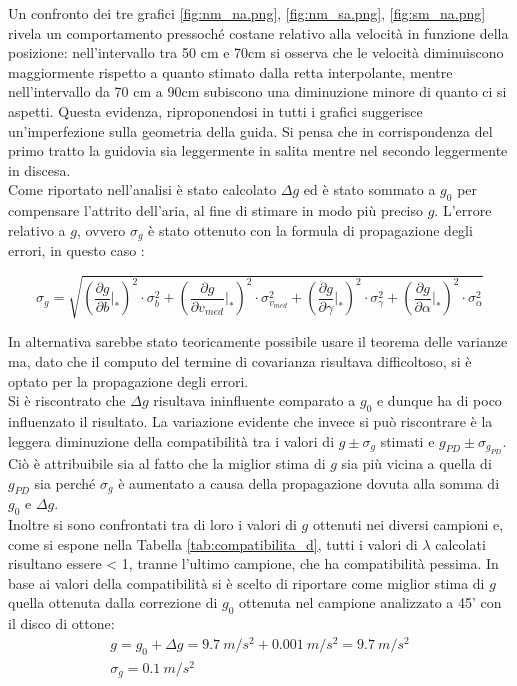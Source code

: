 \documentclass[a4paper,11pt,oneside]{article}
\begin{document}
Un confronto dei tre grafici \ref{fig:nm_na.png}, \ref{fig:nm_sa.png}, \ref{fig:sm_na.png} rivela un comportamento pressoché costane relativo alla velocità in funzione della posizione: nell'intervallo tra 50 \si{cm} e 70\si{cm} si osserva che le velocità diminuiscono maggiormente rispetto a quanto stimato dalla retta interpolante, mentre nell'intervallo da 70 \si{cm} a 90\si{cm} subiscono una diminuzione minore di quanto ci si aspetti. Questa evidenza, riproponendosi in tutti i grafici suggerisce un'imperfezione sulla geometria della guida. Si pensa che in corrispondenza del primo tratto la guidovia sia leggermente in salita mentre nel secondo leggermente in discesa.\\
Come riportato nell'analisi è stato calcolato $\Delta g$ ed è stato sommato a $g_0$ per compensare l'attrito dell'aria, al fine di stimare in modo più preciso $g$. L'errore relativo a $g$, ovvero $\sigma_{g}$ è stato ottenuto con la formula di propagazione degli errori, in questo caso :

\begin{equation*}
      \sigma_{g}= \sqrt{
   \left( {\frac{\partial g}{\partial b}} \Big|_{\ast}\right)^{2} \cdot \sigma_{b}^2  +   
   \left( {\frac{\partial g}{\partial v_{med}}}\Big|_{\ast}\right )^{2} \cdot \sigma_{v_{med}}^2   +   
   \left( {\frac{\partial g}{\partial \gamma}}\Big|_{\ast}\right)^{2}  \cdot \sigma_{\gamma}^2 +   
    \left( {\frac{\partial g}{\partial \alpha}}\Big|_{\ast}\right)^{2} \cdot  \sigma_{\alpha}^2}
\end{equation*}

In alternativa sarebbe stato teoricamente possibile usare il teorema delle varianze ma, dato che il computo del termine di covarianza risultava difficoltoso, si è optato per la propagazione degli errori.\\

Si è riscontrato che $\Delta g$ risultava ininfluente comparato a $g_0$ e dunque ha di poco influenzato il risultato. La variazione evidente che invece si può riscontrare è la leggera diminuzione della compatibilità tra i valori di $g \pm \sigma_{g}$ stimati e $g_{PD}\pm \sigma_{g_{PD}}$. Ciò è attribuibile sia al fatto che la miglior stima di $g$ sia più vicina a quella di $g_{PD}$ sia perché $\sigma_{g}$ è aumentato a causa della propagazione dovuta alla somma di $g_{0}$ e $\Delta g$.\\
Inoltre si sono confrontati tra di loro i valori di $g$ ottenuti nei diversi campioni e, come si espone nella Tabella \ref{tab:compatibilita_d}, tutti i valori di $\lambda$ calcolati risultano essere < 1, tranne l'ultimo campione, che ha compatibilità pessima.
In base ai valori della compatibilità si è scelto di riportare come miglior stima di $g$ quella ottenuta dalla correzione di $g_0$ ottenuta nel campione analizzato a 45' con il disco di ottone:
\begin{gather*}
g= g_{0} + \Delta g =\SI{9.7}{m/s^{2}} + \SI{0.001}{m/s^{2}} = \SI{9.7}{m/s^{2}}\\
\sigma_g=\SI{0.1}{m/s^{2}}
\end{gather*}
\end{document}
